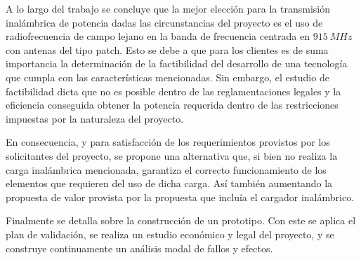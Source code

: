 A lo largo del trabajo se concluye que la mejor elección para la transmisión inalámbrica de potencia dadas las circunstancias del proyecto es el uso de radiofrecuencia de campo lejano en la banda de frecuencia centrada en $915 \ MHz$ con antenas del tipo patch. Esto se debe a que para los clientes es de suma importancia la determinación de la factibilidad del desarrollo de una tecnología que cumpla con las características mencionadas. Sin embargo, el estudio de factibilidad dicta que no es posible dentro de las reglamentaciones legales y la eficiencia conseguida obtener la potencia requerida dentro de las restricciones impuestas por la naturaleza del proyecto.

En consecuencia, y para satisfacción de los requerimientos provistos por los solicitantes del proyecto, se propone una alternativa que, si bien no realiza la carga inalámbrica mencionada, garantiza el correcto funcionamiento de los elementos que requieren del uso de dicha carga.
Así también aumentando la propuesta de valor provista por la propuesta que incluía el cargador inalámbrico.

Finalmente se detalla sobre la construcción de un prototipo. Con este se aplica el plan de validación, se realiza un estudio económico y legal del proyecto, y se construye continuamente un análisis modal de fallos y efectos.

%